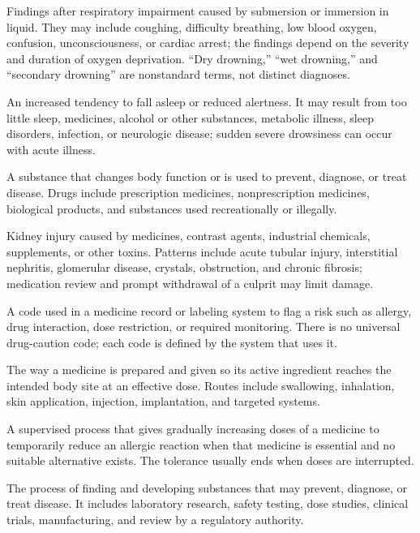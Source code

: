  Findings after respiratory impairment caused by submersion or immersion in liquid. They may include coughing, difficulty breathing, low blood oxygen, confusion, unconsciousness, or cardiac arrest; the findings depend on the severity and duration of oxygen deprivation.
“Dry drowning,” “wet drowning,” and “secondary drowning” are nonstandard terms, not distinct diagnoses.

 An increased tendency to fall asleep or reduced alertness. It may result from too little sleep, medicines, alcohol or other substances, metabolic illness, sleep disorders, infection, or neurologic disease; sudden severe drowsiness can occur with acute illness.

 A substance that changes body function or is used to prevent, diagnose, or treat disease. Drugs include prescription medicines, nonprescription medicines, biological products, and substances used recreationally or illegally.

 Kidney injury caused by medicines, contrast agents, industrial chemicals, supplements, or other toxins. Patterns include acute tubular injury, interstitial nephritis, glomerular disease, crystals, obstruction, and chronic fibrosis; medication review and prompt withdrawal of a culprit may limit damage.

 A code used in a medicine record or labeling system to flag a risk such as allergy, drug interaction, dose restriction, or required monitoring. There is no universal drug-caution code; each code is defined by the system that uses it.

 The way a medicine is prepared and given so its active ingredient reaches the intended body site at an effective dose. Routes include swallowing, inhalation, skin application, injection, implantation, and targeted systems.

 A supervised process that gives gradually increasing doses of a medicine to temporarily reduce an allergic reaction when that medicine is essential and no suitable alternative exists. The tolerance usually ends when doses are interrupted.

 The process of finding and developing substances that may prevent, diagnose, or treat disease. It includes laboratory research, safety testing, dose studies, clinical trials, manufacturing, and review by a regulatory authority.

